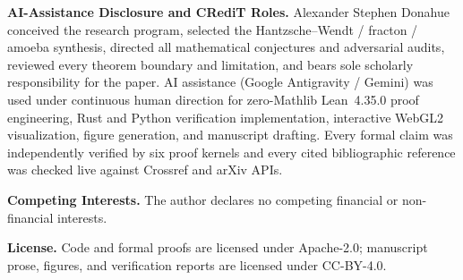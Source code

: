 \documentclass[11pt,reqno]{amsart}
\theoremstyle{definition}
\begin{document}
\textbf{AI-Assistance Disclosure and CRediT Roles.} Alexander Stephen Donahue conceived the
research program, selected the Hantzsche--Wendt / fracton / amoeba synthesis, directed all
mathematical conjectures and adversarial audits, reviewed every theorem boundary and limitation,
and bears sole scholarly responsibility for the paper. AI assistance (Google Antigravity / Gemini)
was used under continuous human direction for zero-Mathlib Lean~4.35.0 proof engineering, Rust and
Python verification implementation, interactive WebGL2 visualization, figure generation, and
manuscript drafting. Every formal claim was independently verified by six proof kernels and every
cited bibliographic reference was checked live against Crossref and arXiv APIs.

\textbf{Competing Interests.} The author declares no competing financial or non-financial interests.

\textbf{License.} Code and formal proofs are licensed under Apache-2.0; manuscript prose, figures,
and verification reports are licensed under CC-BY-4.0.



\end{document}
